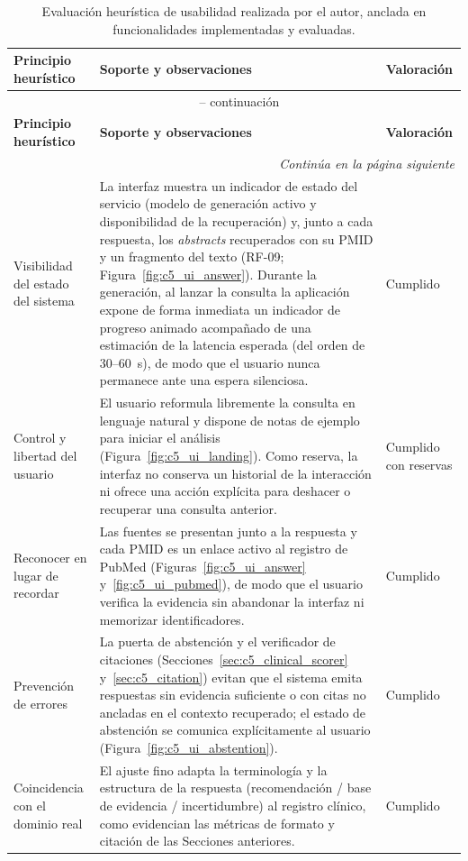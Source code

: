 \documentclass[11pt,a4paper,spanish]{book}
\numberwithin{equation}{chapter}
\numberwithin{figure}{chapter}
\begin{document}
\begin{longtable}{|p{}|p{}|p{}|}
\caption{Evaluación heurística de usabilidad realizada por el autor, anclada en funcionalidades implementadas y evaluadas.}
\label{tab:c6_heuristica} \\
\hline
\textbf{Principio heurístico} & \textbf{Soporte y observaciones} & \textbf{Valoración} \\
\hline
\endfirsthead
\multicolumn{3}{c}{{\tablename\ \thetable{} -- continuación}} \\
\hline
\textbf{Principio heurístico} & \textbf{Soporte y observaciones} & \textbf{Valoración} \\
\hline
\endhead
\hline
\multicolumn{3}{r}{\textit{Continúa en la página siguiente}} \\
\endfoot
\hline
\endlastfoot
Visibilidad del estado del sistema & La interfaz muestra un indicador de estado del servicio (modelo de generación activo y disponibilidad de la recuperación) y, junto a cada respuesta, los \textit{abstracts} recuperados con su PMID y un fragmento del texto (RF-09; Figura~\ref{fig:c5_ui_answer}). Durante la generación, al lanzar la consulta la aplicación expone de forma inmediata un indicador de progreso animado acompañado de una estimación de la latencia esperada (del orden de 30--60~s), de modo que el usuario nunca permanece ante una espera silenciosa. & Cumplido \\
\hline
Control y libertad del usuario & El usuario reformula libremente la consulta en lenguaje natural y dispone de notas de ejemplo para iniciar el análisis (Figura~\ref{fig:c5_ui_landing}). Como reserva, la interfaz no conserva un historial de la interacción ni ofrece una acción explícita para deshacer o recuperar una consulta anterior. & Cumplido con reservas \\
\hline
Reconocer en lugar de recordar & Las fuentes se presentan junto a la respuesta y cada PMID es un enlace activo al registro de PubMed (Figuras~\ref{fig:c5_ui_answer} y~\ref{fig:c5_ui_pubmed}), de modo que el usuario verifica la evidencia sin abandonar la interfaz ni memorizar identificadores. & Cumplido \\
\hline
Prevención de errores & La puerta de abstención y el verificador de citaciones (Secciones~\ref{sec:c5_clinical_scorer} y~\ref{sec:c5_citation}) evitan que el sistema emita respuestas sin evidencia suficiente o con citas no ancladas en el contexto recuperado; el estado de abstención se comunica explícitamente al usuario (Figura~\ref{fig:c5_ui_abstention}). & Cumplido \\
\hline
Coincidencia con el dominio real & El ajuste fino adapta la terminología y la estructura de la respuesta (recomendación / base de evidencia / incertidumbre) al registro clínico, como evidencian las métricas de formato y citación de las Secciones anteriores. & Cumplido \\
\hline
\end{longtable}
\end{document}
